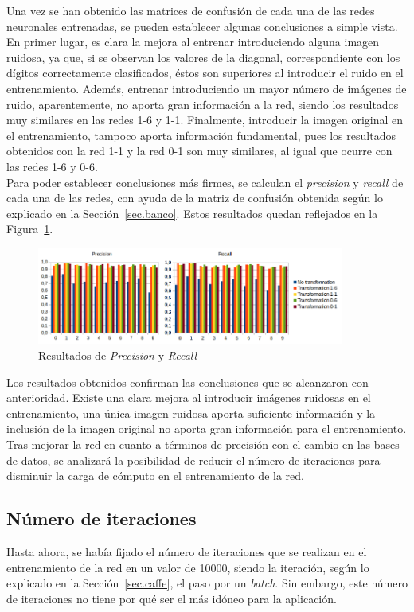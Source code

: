 Una vez se han obtenido las matrices de confusión de cada una de las redes neuronales entrenadas, se pueden establecer algunas conclusiones a simple vista. En primer lugar, es clara la mejora al entrenar introduciendo alguna imagen ruidosa, ya que, si se observan los valores de la diagonal, correspondiente con los dígitos correctamente clasificados, éstos son superiores al introducir el ruido en el entrenamiento. Además, entrenar introduciendo un mayor número de imágenes de ruido, aparentemente, no aporta gran información a la red, siendo los resultados muy similares en las redes 1-6 y 1-1. Finalmente, introducir la imagen original en el entrenamiento, tampoco aporta información fundamental, pues los resultados obtenidos con la red 1-1 y la red 0-1 son muy similares, al igual que ocurre con las redes 1-6 y 0-6.\\

Para poder establecer conclusiones más firmes, se calculan el \textit{precision} y \textit{recall} de cada una de las redes, con ayuda de la matriz de confusión obtenida según lo explicado en la Sección~\ref{sec.banco}. Estos resultados quedan reflejados en la Figura~\ref{fig.precision-recall}.
\begin{figure}[H]
	\centering
	\includegraphics[width=0.9\textwidth]{figures/precision-recall}
	\caption{Resultados de \textit{Precision} y \textit{Recall}}
	\label{fig.precision-recall}
\end{figure}
Los resultados obtenidos confirman las conclusiones que se alcanzaron con anterioridad. Existe una clara mejora al introducir imágenes ruidosas en el entrenamiento, una única imagen ruidosa aporta suficiente información y la inclusión de la imagen original no aporta gran información para el entrenamiento.\\

Tras mejorar la red en cuanto a términos de precisión con el cambio en las bases de datos, se analizará la posibilidad de reducir el número de iteraciones para disminuir la carga de cómputo en el entrenamiento de la red.

\subsection{Número de iteraciones}
Hasta ahora, se había fijado el número de iteraciones que se realizan en el entrenamiento de la red en un valor de 10000, siendo la iteración, según lo explicado en la Sección~\ref{sec.caffe}, el paso por un \textit{batch}. Sin embargo, este número de iteraciones no tiene por qué ser el más idóneo para la aplicación.\\

